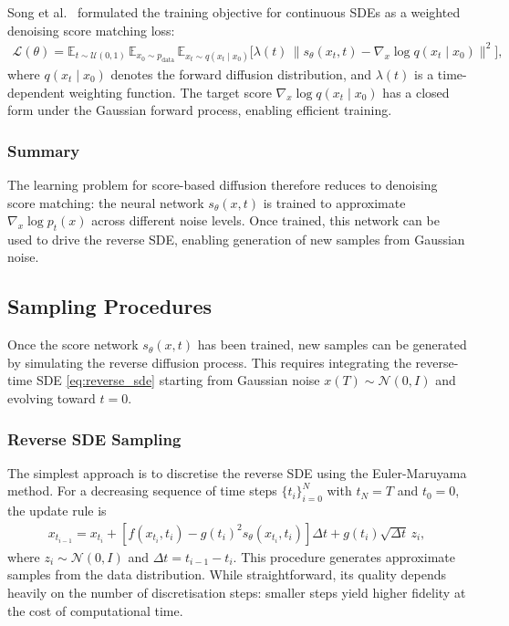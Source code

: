 \documentclass[a4paper,12pt]{article}
\begin{document}
Song et al.~\cite{song2021ScoreBasedGenerativeModeling} formulated the training objective for continuous SDEs as a weighted denoising score matching loss:
\begin{align*}
    \mathcal{L}(\theta) = \mathbb{E}_{t \sim \mathcal{U}(0,1)} \, \mathbb{E}_{x_0 \sim p_{\text{data}}} \, \mathbb{E}_{x_t \sim q(x_t \mid x_0)} \Big[ \lambda(t) \, \| s_\theta(x_t, t) - \nabla_x \log q(x_t \mid x_0) \|^2 \Big],
\end{align*}
where \(q(x_t \mid x_0)\) denotes the forward diffusion distribution, and \(\lambda(t)\) is a time-dependent weighting function. The target score \(\nabla_x \log q(x_t \mid x_0)\) has a closed form under the Gaussian forward process, enabling efficient training. 

\subsubsection{Summary}
The learning problem for score-based diffusion therefore reduces to denoising score matching: the neural network \(s_\theta(x,t)\) is trained to approximate \(\nabla_x \log p_t(x)\) across different noise levels. Once trained, this network can be used to drive the reverse SDE, enabling generation of new samples from Gaussian noise.

\subsection{Sampling Procedures}
Once the score network \(s_\theta(x,t)\) has been trained, new samples can be generated by simulating the reverse diffusion process. This requires integrating the reverse-time SDE \eqref{eq:reverse_sde} starting from Gaussian noise \(x(T) \sim \mathcal{N}(0,I)\) and evolving toward \(t=0\).

\subsubsection{Reverse SDE Sampling}
The simplest approach is to discretise the reverse SDE using the Euler-Maruyama method. 
For a decreasing sequence of time steps \(\{t_i\}_{i=0}^N\) with \(t_N = T\) and \(t_0 = 0\), the update rule is
\begin{align*}
    x_{t_{i-1}} = x_{t_i} + \left[f(x_{t_i},t_i) - g(t_i)^2 s_\theta(x_{t_i},t_i)\right]\Delta t + g(t_i)\sqrt{\Delta t}\,z_i,
\end{align*}
where \(z_i \sim \mathcal{N}(0,I)\) and \(\Delta t = t_{i-1} - t_i\). This procedure generates approximate samples from the data distribution. While straightforward, its quality depends heavily on the number of discretisation steps: smaller steps yield higher fidelity at the cost of computational time.
\end{document}
